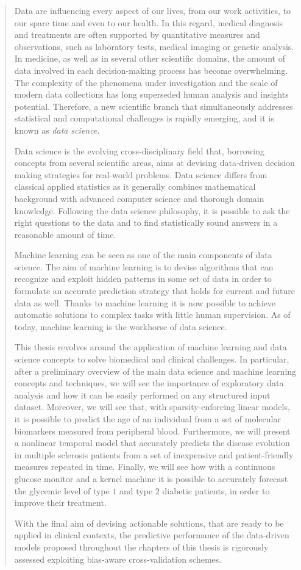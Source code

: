 
\begin{quotation}
\noindent

Data are influencing every aspect of our lives, from our work activities, to our spare time and even to our health.
In this regard, medical diagnosis and treatments are often supported by quantitative measures and observations, such as laboratory tests, medical imaging or genetic analysis.
In medicine, as well as in several other scientific domains, the amount of data involved in each decision-making process has become overwhelming.
The complexity of the phenomena under investigation and the scale of modern data collections has long superseded human analysis and insights potential.
Therefore, a new scientific branch that simultaneously addresses statistical and computational challenges is rapidly emerging, and it is known as \textit{data science}.

Data science is the evolving cross-disciplinary field that, borrowing concepts from several scientific areas, aims at devising data-driven decision making strategies for real-world problems.
Data science differs from classical applied statistics as it generally combines mathematical background with advanced computer science and thorough domain knowledge.
Following the data science philosophy, it is possible to ask the right questions to the data and to find statistically sound answers in a reasonable amount of time.

Machine learning can be seen as one of the main components of data science. The aim of machine learning is to devise algorithms that can recognize and exploit hidden patterns in some set of data in order to formulate an accurate prediction strategy that holds for current and future data as well. Thanks to machine learning it is now possible to achieve automatic solutions to complex tasks with little human supervision.
As of today, machine learning is the workhorse of data science.

This thesis revolves around the application of machine learning and data science concepts to solve biomedical and clinical challenges. In particular, after a preliminary overview of the main data science and machine learning concepts and techniques, we will see the importance of exploratory data analysis and how it can be easily performed on any structured input dataset. Moreover, we will see that, with sparsity-enforcing linear models, it is possible to predict the age of an individual from a set of molecular biomarkers measured from peripheral blood. Furthermore, we will present a nonlinear temporal model that accurately predicts the disease evolution in multiple sclerosis patients from a set of inexpensive and patient-friendly measures repeated in time. Finally, we will see how with a continuous glucose monitor and a kernel machine it is possible to accurately forecast the glycemic level of type $1$ and type $2$ diabetic patients, in order to improve their treatment.

With the final aim of devising actionable solutions, that are ready to be applied in clinical contexts, the predictive performance of the data-driven models proposed throughout the chapters of this thesis is rigorously assessed exploiting bias-aware cross-validation schemes.




\end{quotation}